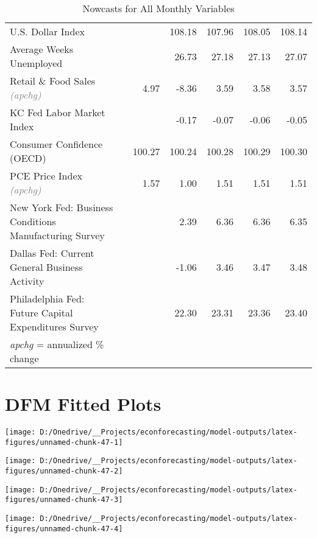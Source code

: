 \documentclass[11pt, letterpaper]{article}\usepackage[]{graphicx}\usepackage[]{color}
\begin{document}
\begin{table}[H]
\begin{tabular}{lrrrrrr}
  U.S. Dollar Index &  &  & 108.18 & 107.96 & 108.05 & 108.14 \\ 
  Average Weeks Unemployed &  &  & 26.73 & 27.18 & 27.13 & 27.07 \\ 
  Retail \& Food Sales \textit{\footnotesize\textcolor{gray}{(apchg)}} &  & 4.97 & -8.36 & 3.59 & 3.58 & 3.57 \\ 
  KC Fed Labor Market Index &  &  & -0.17 & -0.07 & -0.06 & -0.05 \\ 
  Consumer Confidence (OECD) &  & 100.27 & 100.24 & 100.28 & 100.29 & 100.30 \\ 
  PCE Price Index \textit{\footnotesize\textcolor{gray}{(apchg)}} &  & 1.57 & 1.00 & 1.51 & 1.51 & 1.51 \\ 
  New York Fed: Business Conditions Manufacturing Survey &  &  & 2.39 & 6.36 & 6.36 & 6.35 \\ 
  Dallas Fed: Current General Business Activity &  &  & -1.06 & 3.46 & 3.47 & 3.48 \\ 
  Philadelphia Fed: Future Capital Expenditures Survey &  &  & 22.30 & 23.31 & 23.36 & 23.40 \\ 
   \hline 
 \textit{apchg} = annualized \% change 
\end{tabular}
\endgroup
\caption{Nowcasts for All Monthly Variables} 
\end{table}



\appendix
\appendixpage
\addappheadtotoc

\section{DFM Fitted Plots}


{\centering \texttt{[image: D:/Onedrive/\_\_Projects/econforecasting/model-outputs/latex-figures/unnamed-chunk-47-1]} 

}




{\centering \texttt{[image: D:/Onedrive/\_\_Projects/econforecasting/model-outputs/latex-figures/unnamed-chunk-47-2]} 

}




{\centering \texttt{[image: D:/Onedrive/\_\_Projects/econforecasting/model-outputs/latex-figures/unnamed-chunk-47-3]} 

}




{\centering \texttt{[image: D:/Onedrive/\_\_Projects/econforecasting/model-outputs/latex-figures/unnamed-chunk-47-4]} 

}
\end{document}

